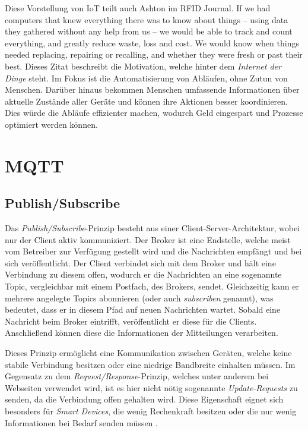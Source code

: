         Diese Vorstellung von \ac{IoT} teilt auch Ashton im RFID Journal.
        \glqq If we had computers that knew everything there was to know about things -- using data they gathered without any help from us -- we would be able to track and count everything, and greatly reduce waste, loss and cost. We would know when things needed replacing, repairing or recalling, and whether they were fresh or past their best.\grqq{} \cite{ashton2009internet}
        Dieses Zitat beschreibt die Motivation, welche hinter dem \emph{Internet der Dinge} steht.
        Im Fokus ist die Automatisierung von Abläufen, ohne Zutun von Menschen. Darüber hinaus bekommen Menschen umfassende Informationen über aktuelle Zustände aller Geräte und können ihre Aktionen besser koordinieren. Dies würde die Abläufe effizienter machen, wodurch Geld eingespart und Prozesse optimiert werden können.

\section{MQTT} \label{MQTT}
    \subsection{Publish/Subscribe}
    Das \emph{Publish/Subscribe}-Prinzip besteht aus einer Client-Server-Architektur, wobei nur der Client aktiv kommuniziert. Der Broker ist eine Endstelle, welche meist vom Betreiber zur Verfügung gestellt wird und die Nachrichten empfängt und bei sich veröffentlicht. Der Client verbindet sich mit dem Broker und hält eine Verbindung zu diesem offen, wodurch er die Nachrichten an eine sogenannte Topic, vergleichbar mit einem Postfach, des Brokers, sendet. Gleichzeitig kann er mehrere angelegte Topics abonnieren (oder auch  \emph{subscriben} genannt), was bedeutet, dass er in diesem Pfad auf neuen Nachrichten wartet. Sobald eine Nachricht beim Broker eintrifft, veröffentlicht er diese für die Clients. Anschließend können diese die Informationen der Mitteilungen verarbeiten. \cite{Redbooks2012}

    Dieses Prinzip ermöglicht eine Kommunikation zwischen Geräten, welche keine stabile Verbindung besitzen oder eine niedrige Bandbreite einhalten müssen. Im Gegensatz zu dem \emph{Request/Response}-Prinzip, welches unter anderem bei Webseiten verwendet wird, ist es hier nicht nötig sogenannte \emph{Update-Requests} zu senden, da die Verbindung offen gehalten wird.
    Diese Eigenschaft eignet sich besonders für \emph{Smart Devices}, die wenig Rechenkraft besitzen oder die nur wenig Informationen bei Bedarf senden müssen \cite{Hwang2016}.

